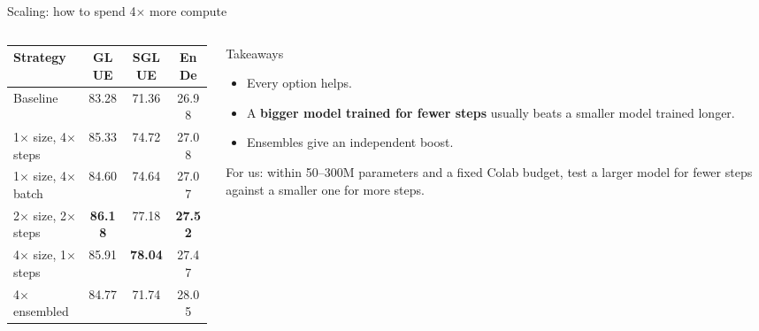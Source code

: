 \documentclass[aspectratio=169,11pt]{beamer}
\begin{document}
\begin{frame}{Scaling: how to spend 4$\times$ more compute}
  \begin{columns}[T]
    \begin{column}{0.54\textwidth}
      \footnotesize
      \begin{tabular}{@{}lccc@{}}
        \toprule
        Strategy & GLUE & SGLUE & EnDe\\
        \midrule
        Baseline & 83.28 & 71.36 & 26.98\\
        1$\times$ size, 4$\times$ steps & 85.33 & 74.72 & 27.08\\
        1$\times$ size, 4$\times$ batch & 84.60 & 74.64 & 27.07\\
        2$\times$ size, 2$\times$ steps & \textbf{86.18} & 77.18 & \textbf{27.52}\\
        4$\times$ size, 1$\times$ steps & 85.91 & \textbf{78.04} & 27.47\\
        4$\times$ ensembled & 84.77 & 71.74 & 28.05\\
        \bottomrule
      \end{tabular}
    \end{column}
    \begin{column}{0.42\textwidth}
      \begin{exampleblock}{Takeaways}
        \small
        \begin{itemize}
          \item Every option helps.
          \item A \textbf{bigger model trained for fewer steps} usually beats a smaller model trained longer.
          \item Ensembles give an independent boost.
        \end{itemize}
        For us: within 50--300M parameters and a fixed Colab budget, test a larger model for fewer steps against a smaller one for more steps.
      \end{exampleblock}
    \end{column}
  \end{columns}
\end{frame}
\end{document}
